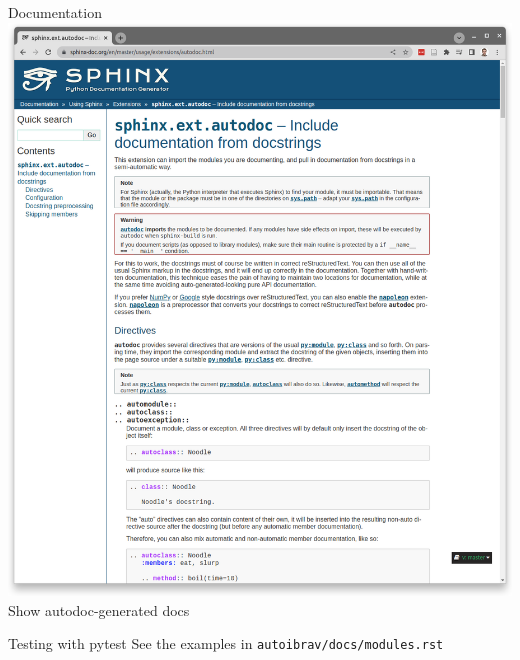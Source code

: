 \documentclass[xcolor=table,aspectratio=169]{beamer}
\numberwithin{equation}{section}
\begin{document}
\begin{frame}{Documentation}
  \includegraphics[width=\textwidth]{figures/autodoc.png}
  Show autodoc-generated docs
\end{frame}

\begin{frame}{Testing with pytest}
  See the examples in \texttt{autoibrav/docs/modules.rst}
\end{frame}
\end{document}
